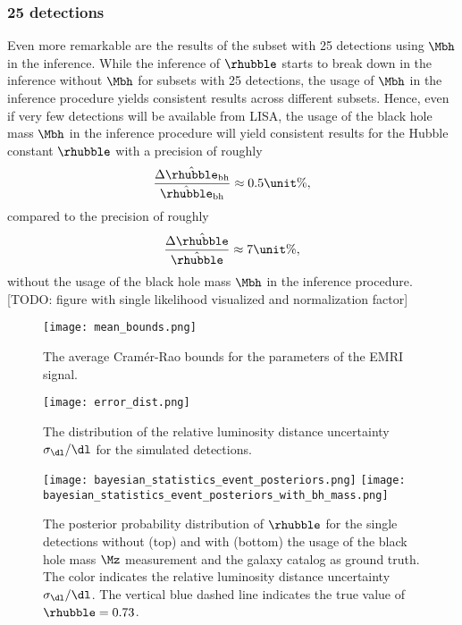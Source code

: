 \subsubsection{25 detections}
Even more remarkable are the results of the subset with 25 detections using $\Mbh$ in the inference. While the inference of $\rhubble$ starts to break down in the inference without $\Mbh$ for subsets with 25 detections, the usage of $\Mbh$ in the inference procedure yields consistent results across different subsets. Hence, even if very few detections will be available from LISA, the usage of the black hole mass $\Mbh$ in the inference procedure will yield consistent results for the Hubble constant $\rhubble$ with a precision of roughly
\begin{equation}
    \frac{\Delta \hat{\rhubble}_{\text{bh}}}{\hat{\rhubble}_{\text{bh}}} \approx 0.5\unit{\%},
\end{equation}
compared to the precision of roughly
\begin{equation}
    \frac{\Delta \hat{\rhubble}}{\hat{\rhubble}} \approx 7\unit{\%},
\end{equation}
without the usage of the black hole mass $\Mbh$ in the inference procedure.
    [TODO: figure with single likelihood visualized and normalization factor]

\begin{figure}
    \centering
    \texttt{[image: mean\_bounds.png]}
    \caption[Average Cramér-Rao bounds]{The average Cramér-Rao bounds for the parameters of the EMRI signal.}
    \label{fig:galaxy-catalog-only-cramer-rao-bounds}
\end{figure}

\begin{figure}
    \centering
    \texttt{[image: error\_dist.png]}
    \caption[Relative luminosity distance uncertainty]{The distribution of the relative luminosity distance uncertainty $\sigma_{\dl} / \dl$ for the simulated detections.}
    \label{fig:rel-luminosity-distance-uncertainty}
\end{figure}

\begin{figure}
    \centering
    \texttt{[image: bayesian\_statistics\_event\_posteriors.png]}
    \texttt{[image: bayesian\_statistics\_event\_posteriors\_with\_bh\_mass.png]}
    \caption[Posterior probability distribution of single detections]{The posterior probability distribution of $\rhubble$ for the single detections without (top) and with (bottom) the usage of the black hole mass $\Mz$ measurement and the galaxy catalog as ground truth. The color indicates the relative luminosity distance uncertainty $\sigma_{\dl} / \dl$. The vertical blue dashed line indicates the true value of $\rhubble = 0.73$.}
    \label{fig:posterior-rhubble-single-detections}
\end{figure}

